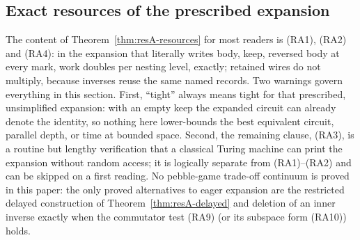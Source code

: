 
\subsection{Exact resources of the prescribed expansion}

\begin{remark}
The content of Theorem~\ref{thm:resA-resources} for most readers is (RA1),
(RA2) and (RA4): in the expansion that literally writes body, keep,
reversed body at every mark, work doubles per nesting level, exactly;
retained wires do not multiply, because inverses reuse the same named
records. Two warnings govern everything in this section. First, ``tight''
always means tight for that prescribed, unsimplified expansion: with an
empty keep the expanded circuit can already denote the identity, so
nothing here lower-bounds the best equivalent circuit, parallel depth,
or time at bounded space. Second, the remaining clause, (RA3), is a
routine but lengthy verification that a classical Turing machine can
print the expansion without random access; it is logically separate from
(RA1)--(RA2) and can be skipped on a first reading. No pebble-game
trade-off continuum is proved in this paper: the only proved alternatives
to eager expansion are the restricted delayed construction of
Theorem~\ref{thm:resA-delayed} and deletion of an inner inverse exactly
when the commutator test (RA9) (or its subspace form (RA10)) holds.
\end{remark}

